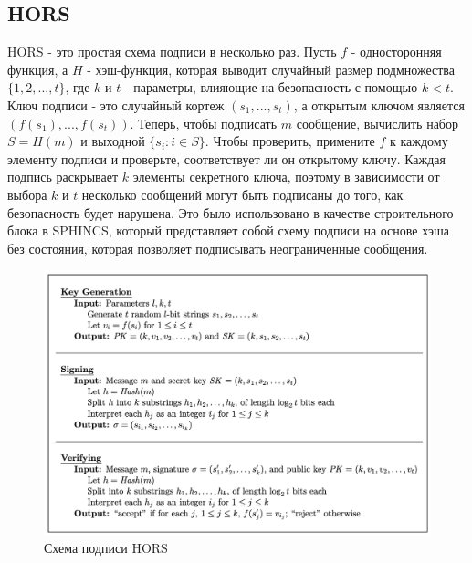 \documentclass[a4paper, 14pt]{extarticle}
\begin{document}
\subsection{HORS}
HORS - это простая схема подписи в несколько раз. Пусть $f$ - односторонняя функция, а $H$ - хэш-функция, которая выводит случайный размер подмножества $\{1,2,...,t\}$, где $k$ и $t$ - параметры, влияющие на безопасность с помощью $k < t$. Ключ подписи - это случайный кортеж $(s_1,...,s_t)$, а открытым ключом является $(f(s_{1}),..., f(s_{t}))$. 
Теперь, чтобы подписать $m$ сообщение, вычислить набор $S = H(m)$ и выходной $\{s_{i} : i \in S\}$. Чтобы проверить, примените $f$ к каждому элементу подписи и проверьте, соответствует ли он открытому ключу. Каждая подпись раскрывает $k$ элементы секретного ключа, поэтому в зависимости от выбора $k$ и $t$ несколько сообщений могут быть подписаны до того, как безопасность будет нарушена. Это было использовано в качестве строительного блока в SPHINCS, который представляет собой схему подписи на основе хэша без состояния, которая позволяет подписывать неограниченные сообщения.

\begin{figure}[h]
    \centering
    \includegraphics[scale=0.66]{HORS.png}
    \caption{Схема подписи HORS}
\end{figure}
\end{document}
